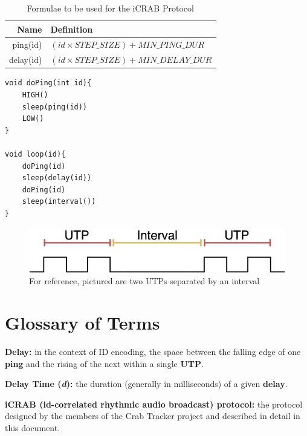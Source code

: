 \documentclass[12pt]{article}
\begin{document}
\begin{table}[ht]
\centering
\begin{tabular}{|r|l|}
\hline
Name & Definition \\
\hline
ping(id)		&	$(id \times STEP\_SIZE)+MIN\_PING\_DUR$	\\
delay(id)	&	$(id \times STEP\_SIZE)+MIN\_DELAY\_DUR$	\\
\hline
\end{tabular}
\caption{Formulae to be used for the iCRAB Protocol}\label{table:formulae}
\end{table}

\begin{lstlisting}[caption={Transmitter Behavior},label={lst:tx}]
void doPing(int id){
	HIGH()
	sleep(ping(id))
	LOW()
}

void loop(id){
	doPing(id)
	sleep(delay(id))
	doPing(id)
	sleep(interval())
}
\end{lstlisting}

\begin{figure}[h]
\centering
\includegraphics[scale=0.5]{interval}

\caption{For reference, pictured are two UTPs separated by an interval}
\label{fig:interval}
\end{figure}


\newpage
\appendix
\section{Glossary of Terms} \label{glossary}

{\bf Delay:}
	in the context of ID encoding, the space between the falling edge of one
	{\bf ping} and the rising of the next within a single {\bf UTP}.

{\bf Delay Time ({\em d}):}
	the duration (generally in milliseconds) of a given {\bf delay}.

{\bf iCRAB (id-correlated rhythmic audio broadcast) protocol:}
	the protocol designed by the members of the Crab Tracker project and
	described in detail in this document.
\end{document}
